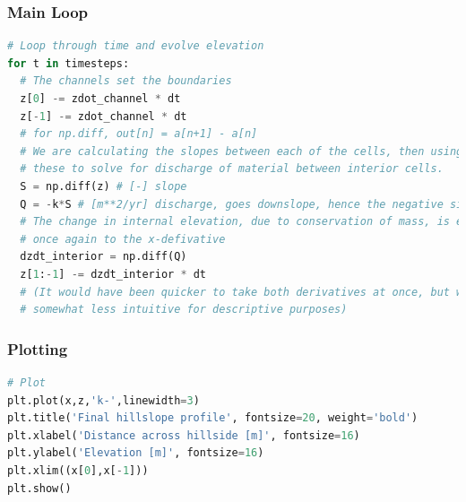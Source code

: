 \documentclass[a4paper,10pt]{scrartcl}
\begin{document}
\subsubsection{Main Loop}

\begin{lstlisting}[language=Python]
# Loop through time and evolve elevation
for t in timesteps:
  # The channels set the boundaries
  z[0] -= zdot_channel * dt
  z[-1] -= zdot_channel * dt
  # for np.diff, out[n] = a[n+1] - a[n]
  # We are calculating the slopes between each of the cells, then using 
  # these to solve for discharge of material between interior cells.
  S = np.diff(z) # [-] slope
  Q = -k*S # [m**2/yr] discharge, goes downslope, hence the negative sign # POSITIVE - WHY? CANCELLED OUT AGAIN!
  # The change in internal elevation, due to conservation of mass, is equal 
  # once again to the x-defivative
  dzdt_interior = np.diff(Q)
  z[1:-1] -= dzdt_interior * dt
  # (It would have been quicker to take both derivatives at once, but would be 
  # somewhat less intuitive for descriptive purposes)
\end{lstlisting}

\subsubsection{Plotting}

\begin{lstlisting}[language=Python]
# Plot
plt.plot(x,z,'k-',linewidth=3)
plt.title('Final hillslope profile', fontsize=20, weight='bold')
plt.xlabel('Distance across hillside [m]', fontsize=16)
plt.ylabel('Elevation [m]', fontsize=16)
plt.xlim((x[0],x[-1]))
plt.show()
\end{lstlisting}
\end{document}
